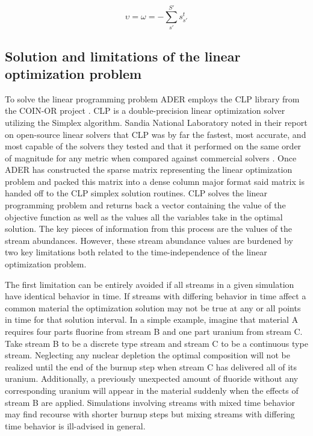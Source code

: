 \begin{equation}
\label{eq:upsilon_bound}
\upsilon = \omega = -\sum \limits_{s'}^{S'} s_{s'}^{t}
\end{equation}




\subsection{Solution and limitations of the linear optimization problem} \label{ssec:sol}
To solve the linear programming problem ADER employs the
CLP library from the COIN-OR project \cite{lougee-heimer_common_2003}. 
CLP is a double-precision linear optimization solver utilizing the Simplex 
algorithm. Sandia National Laboratory noted in their report on open-source
linear solvers that CLP was by far the fastest, most accurate, and most
capable of the solvers they tested and that it performed on the same
order of magnitude for any metric when compared against commercial solvers
\cite{gearhart_comparison_2013}.
Once ADER has constructed the
sparse matrix representing the linear optimization problem
and packed this matrix into a dense column major format said
matrix is handed off to the CLP simplex solution routines. 
CLP solves the linear programming problem and returns back a
vector containing the value of the objective function as well as the values
all the variables take in the optimal solution. The key pieces of information 
from this process are the values of the stream abundances. However, these
stream abundance values are burdened by two key limitations both related to the
time-independence of the linear optimization problem. 

The first limitation can be entirely avoided if all streams in a given
simulation have identical behavior in time. If streams with differing behavior
in time affect a common material the optimization solution may not be true at
any or all points in time for that solution interval. In a simple example,
imagine that material A requires four parts fluorine from stream B and one part
uranium from stream C. Take stream B to be a discrete type stream and stream C
to be a continuous type stream. Neglecting any nuclear depletion the optimal
composition will not be realized until the end of the burnup step when stream C
has delivered all of its uranium. Additionally, a previously unexpected amount
of fluoride without any corresponding uranium will appear in the material 
suddenly when the effects of stream B are applied.
Simulations involving streams with mixed time
behavior may find recourse with shorter burnup steps but mixing streams with
differing time behavior is ill-advised in general.

